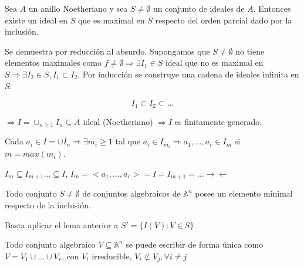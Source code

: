 \begin{Lem}
Sea $A$ un anillo Noetheriano y sea $S \neq \emptyset$ un conjunto de ideales de $A$. Entonces existe un ideal en $S$ que es maximal en $S$ respecto del orden parcial dado por la inclusión.
\end{Lem}

\begin{Dem}
Se demuestra por reducción al absurdo. Supongamos que $S\neq \emptyset$ no tiene elementos maximales como $f\neq \emptyset \Rightarrow \exists I_1 \in S$ ideal que no es maximal en $S \Rightarrow \exists I_2 \in S, I_1 \subset I_2$. Por inducción se construye una cadena de ideales infinita en $S$: 

$$ I_1 \subset I_2 \subset \dots $$

$\Rightarrow I=\cup_{n\ge 1} I_n \subseteq A$ ideal (Noetheriano) $\Rightarrow I$ es finitamente generado.

Cada $a_i\in I=\cup I_n \Rightarrow \exists m_i\ge 1 $ tal que $a_i \in I_{m_i} \Rightarrow a_1,\dots , a_r \in I_m$ si $m=max (m_i)$.

$I_m\subseteq I_{m+1} \dots \subseteq I$, $I_m =<a_1,\dots , a_r >=I=I_{m+1}=\dots \rightarrow \leftarrow $
\end{Dem}

\begin{Cor}
Todo conjunto $S\neq \emptyset $ de conjuntos algebraicos de $\mathbb{A}^n$ posee un elemento minimal respecto de la inclusión. 
\end{Cor}

\begin{Dem}
Basta aplicar el lema anterior a $S'=\{ I(V): V\in S \}$.
\end{Dem}

\begin{Teo}
Todo conjunto algebraico $V\subseteq \mathbb{A}^n$ se puede escribir de forma única como $V=V_1\cup \dots \cup V_r$, con $V_i$ irreducible, $V_i \not \subset V_j, \forall i\neq j$
\end{Teo}

